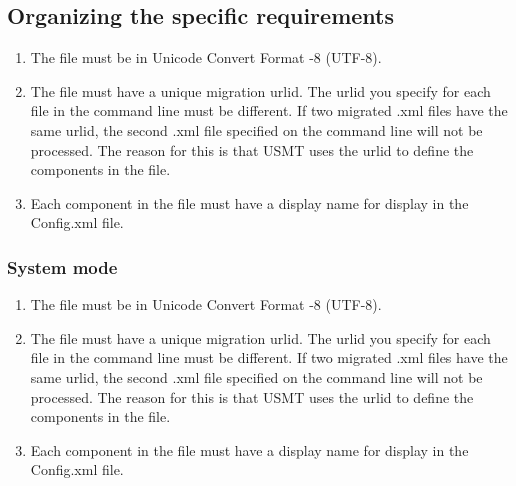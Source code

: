 
\subsection{Organizing the specific requirements}
\begin{enumerate}
    \item The file must be in Unicode Convert Format -8 (UTF-8).
    \item The file must have a unique migration urlid. The urlid you specify for each file in the command line must be different. If two migrated .xml files have the same urlid, the second .xml file specified on the command line will not be processed. The reason for this is that USMT uses the urlid to define the components in the file.
    \item Each component in the file must have a display name for display in the Config.xml file.
\end{enumerate}




\subsubsection{System mode}

\begin{enumerate}
    \item The file must be in Unicode Convert Format -8 (UTF-8).
    \item The file must have a unique migration urlid. The urlid you specify for each file in the command line must be different. If two migrated .xml files have the same urlid, the second .xml file specified on the command line will not be processed. The reason for this is that USMT uses the urlid to define the components in the file.
    \item Each component in the file must have a display name for display in the Config.xml file.
\end{enumerate}

